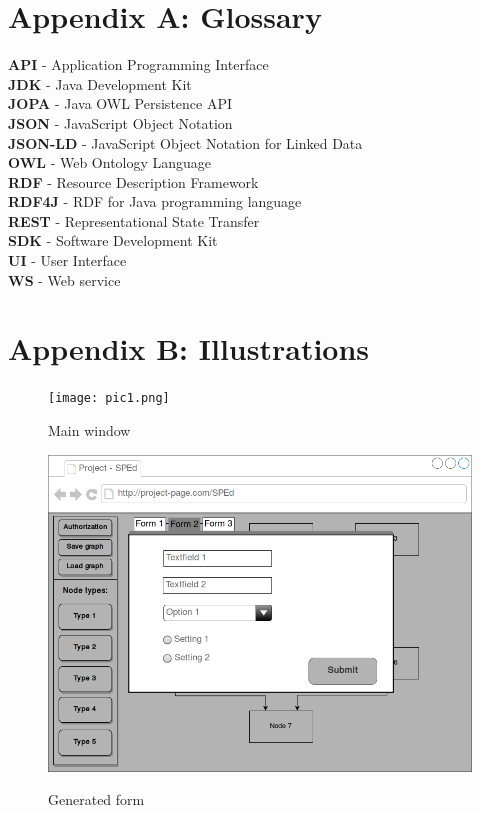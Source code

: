 \documentclass{article}
\begin{document}
\section*{Appendix A: Glossary}
\textbf{API} - Application Programming Interface\\
\textbf{JDK} - Java Development Kit\\
\textbf{JOPA} - Java OWL Persistence API\\
\textbf{JSON} - JavaScript Object Notation\\
\textbf{JSON-LD} - JavaScript Object Notation for Linked Data\\
\textbf{OWL} - Web Ontology Language\\
\textbf{RDF} - Resource Description Framework\\
\textbf{RDF4J} - RDF for Java programming language\\
\textbf{REST} - Representational State Transfer\\
\textbf{SDK} - Software Development Kit\\
\textbf{UI} - User Interface\\
\textbf{WS} - Web service
\newpage
\section*{Appendix B: Illustrations}
\begin{figure}[h!]
    \texttt{[image: pic1.png]}
    \label{pic1}
    \caption{Main window}
\end{figure}
\begin{figure}[h!]
    \includegraphics[width=\textwidth]{pic2.png}
    \label{pic2}
    \caption{Generated form}
\end{figure}
\end{document}
